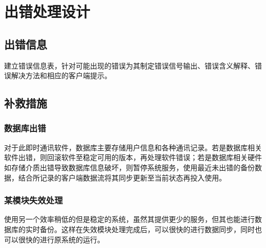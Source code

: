 \chapter{出错处理设计}
\section{出错信息}
建立错误信息表，针对可能出现的错误为其制定错误信号输出、错误含义解释、错误解决方法和相应的客户端提示。

\section{补救措施}
\subsection{数据库出错}
对于此即时通讯软件，数据库主要存储用户信息和各种通讯记录。若是数据库相关软件出错，则回滚软件至稳定可用的版本，再处理软件错误；若是数据库相关硬件如存储介质出错导致数据库信息破坏，则暂停系统服务，使用最近未出错的备份数据，结合所记录的客户端数据流将其同步更新至当前状态再投入使用。

\subsection{某模块失效处理}
使用另一个效率稍低的但是稳定的系统，虽然其提供更少的服务，但其也能进行数据库的实时备份。这样在失效模块处理完成后，可以很快的进行数据同步，同时也可以很快的进行原系统的运行。
